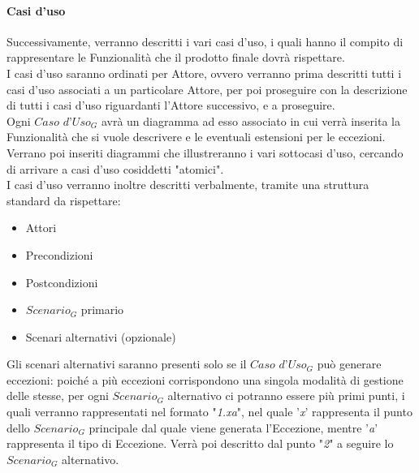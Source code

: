 \paragraph{Casi d'uso}
Successivamente, verranno descritti i vari casi d'uso, i quali hanno il compito di rappresentare le Funzionalità che il prodotto finale dovrà rispettare. \\
I casi d'uso saranno ordinati per Attore, ovvero verranno prima descritti tutti i casi d'uso associati a un particolare Attore, per poi proseguire con la descrizione di tutti i casi d'uso riguardanti l'Attore successivo, e a proseguire. \\
Ogni $\textit{Caso d'Uso}_G$ avrà un diagramma ad esso associato in cui verrà inserita la Funzionalità che si vuole descrivere e le eventuali estensioni per le eccezioni. Verrano poi inseriti diagrammi che illustreranno i vari sottocasi d'uso, cercando di arrivare a casi d'uso cosiddetti "atomici". \\
I casi d'uso verranno inoltre descritti verbalmente, tramite una struttura standard da rispettare:
\begin{itemize}
    \item Attori
    \item Precondizioni
    \item Postcondizioni
    \item $\textit{Scenario}_G$ primario
    \item Scenari alternativi (opzionale)
\end{itemize}
\begin{comment}
I $\textit{sottocasi d'uso}_G$ non verranno descritti individualmente, poiché sarà già tutto descritto a livello atomico nello $\textit{Scenario}_G$ principale del relativo $\textit{Caso d'Uso}_G$ "padre".
\end{comment}
Gli scenari alternativi saranno presenti solo se il $\textit{Caso d'Uso}_G$ può generare eccezioni: poiché a più eccezioni corrispondono una singola modalità di gestione delle stesse, per ogni $\textit{Scenario}_G$ alternativo ci potranno essere più primi punti, i quali verranno rappresentati nel formato "\textit{1.xa}", nel quale '\textit{x}' rappresenta il punto dello $\textit{Scenario}_G$ principale dal quale viene generata l'Eccezione, mentre '\textit{a}' rappresenta il tipo di Eccezione. Verrà poi descritto dal punto "\textit{2}" a seguire lo $\textit{Scenario}_G$ alternativo.
